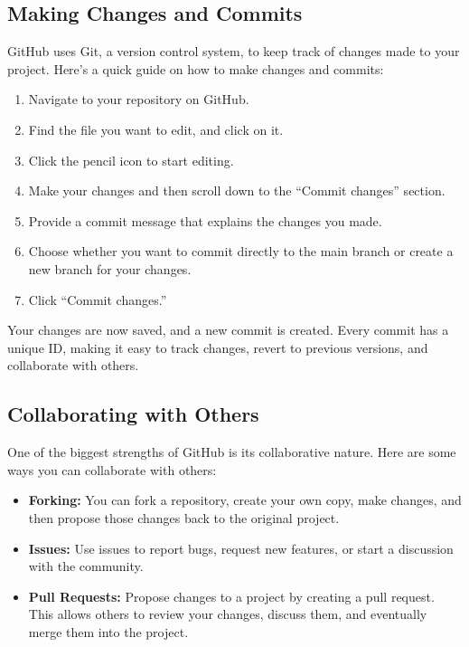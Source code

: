 \documentclass[a4paper,12pt]{book}
\begin{document}
\subsection*{Making Changes and Commits}

GitHub uses Git, a version control system, to keep track of changes made to your project. Here’s a quick guide on how to make changes and commits:

\begin{enumerate}
    \item Navigate to your repository on GitHub.
    \item Find the file you want to edit, and click on it.
    \item Click the pencil icon to start editing.
    \item Make your changes and then scroll down to the “Commit changes” section.
    \item Provide a commit message that explains the changes you made.
    \item Choose whether you want to commit directly to the main branch or create a new branch for your changes.
    \item Click “Commit changes.”
\end{enumerate}

Your changes are now saved, and a new commit is created. Every commit has a unique ID, making it easy to track changes, revert to previous versions, and collaborate with others.

\subsection*{Collaborating with Others}

One of the biggest strengths of GitHub is its collaborative nature. Here are some ways you can collaborate with others:

\begin{itemize}
    \item \textbf{Forking:} You can fork a repository, create your own copy, make changes, and then propose those changes back to the original project.
    \item \textbf{Issues:} Use issues to report bugs, request new features, or start a discussion with the community.
    \item \textbf{Pull Requests:} Propose changes to a project by creating a pull request. This allows others to review your changes, discuss them, and eventually merge them into the project.
\end{itemize}
\end{document}
